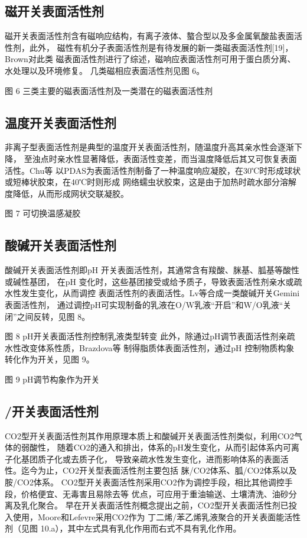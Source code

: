 \documentclass[bachelor,winfonts]{jnuthesis} %
\begin{document}
    \subsection{磁开关表面活性剂}
    磁开关表面活性剂含有磁响应结构，有离子液体、螯合型以及多金属氧酸盐表面活性剂，此外，
    磁性有机分子表面活性剂是有待发展的新一类磁表面活性剂[19]，Brown\cite{brown2015}对此类
    磁表面活性剂进行了综述，磁响应表面活性剂可用于蛋白质分离、水处理以及环境修复\cite{brown2015}。
    几类磁相应表面活性剂见图 6。
    
    图 6 三类主要的磁表面活性剂及一类潜在的磁表面活性剂\cite{brown2015,brown2012}
    
    \subsection{温度开关表面活性剂}
    非离子型表面活性剂是典型的温度开关表面活性剂，随温度升高其亲水性会逐渐下降，
    至浊点时亲水性显著降低，表面活性变差，而当温度降低后其又可恢复表面活性。Chu\cite{chu2011}等
    以PDAS为表面活性剂制备了一种温度响应凝胶，在30℃时形成球状或短棒状胶束，在40℃时则形成
    网络蠕虫状胶束，这是由于加热时疏水部分溶解度降低，从而形成网状交联凝胶。
    
    图 7 可切换温感凝胶
    \subsection{酸碱开关表面活性剂}
    酸碱开关表面活性剂即pH 开关表面活性剂，其通常含有羧酸、脒基、胍基等酸性或碱性基团，
    在pH 变化时，这些基团接受或给予质子，导致表面活性剂亲水或疏水性发生变化，从而调控
    表面活性剂的表面活性\cite{吕湘亮2018}。Lv\cite{lv2014}等合成一类酸碱开关Gemini表面活性剂，
    通过调控pH可实现制备的乳液在O/W乳液“开启”和W/O乳液“关闭”之间反转，见图 8。
    
    图 8 pH开关表面活性剂控制乳液类型转变
    此外，除通过pH调节表面活性剂亲疏水性改变体系性质，Brazdova\cite{李云霞2011,brazdova2008}等
    制得脂质体表面活性剂，通过pH 控制物质构象转化作为开关，见图 9。
    
    图 9 pH调节构象作为开关
    \subsection{/开关表面活性剂}
    CO2型开关表面活性剂其作用原理本质上和酸碱开关表面活性剂类似，利用CO2气体的弱酸性，
    随着CO2的通入和排出，体系的pH发生变化，从而引起体系内可离子化基团质子化或去质子化，
    导致亲疏水性发生变化，进而影响体系的表面活性。迄今为止，CO2开关型表面活性剂主要包括
    脒/CO2体系、胍/CO2体系以及胺/CO2体系\cite{梅平2016}。
    CO2型开关表面活性剂采用CO2作为调控手段，相比其他调控手段，价格便宜、无毒害且易除去等
    优点\cite{jessop2012}，可应用于重油输送、土壤清洗、油砂分离及乳化聚合\cite{jessop2012}。
    早在开关表面活性剂概念提出之前，CO2型开关表面活性剂已投入使用，Moore和Lefevre采用CO2作为
    丁二烯/苯乙烯乳液聚合的开关表面能活性剂（见图 10.a），其中左式具有乳化作用而右式不具有乳化作用。
    
\end{document}
